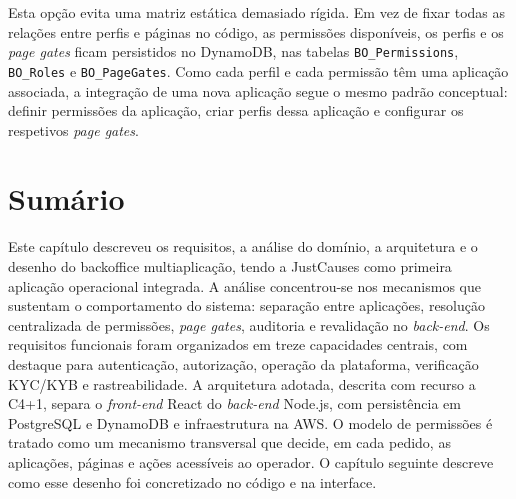 Esta opção evita uma matriz estática demasiado rígida. Em vez de fixar todas as relações entre perfis e páginas no código, as permissões disponíveis, os perfis e os \textit{page gates} ficam persistidos no DynamoDB, nas tabelas \texttt{BO\_Permissions}, \texttt{BO\_Roles} e \texttt{BO\_PageGates}. Como cada perfil e cada permissão têm uma aplicação associada, a integração de uma nova aplicação segue o mesmo padrão conceptual: definir permissões da aplicação, criar perfis dessa aplicação e configurar os respetivos \textit{page gates}.


\section{Sumário}
\label{sec:sumario_cap3}

Este capítulo descreveu os requisitos, a análise do domínio, a arquitetura e o desenho do backoffice multiaplicação, tendo a JustCauses como primeira aplicação operacional integrada. A análise concentrou-se nos mecanismos que sustentam o comportamento do sistema: separação entre aplicações, resolução centralizada de permissões, \textit{page gates}, auditoria e revalidação no \textit{back-end}. Os requisitos funcionais foram organizados em treze capacidades centrais, com destaque para autenticação, autorização, operação da plataforma, verificação \gls{KYC}/\gls{KYB} e rastreabilidade. A arquitetura adotada, descrita com recurso a C4+1, separa o \textit{front-end} React do \textit{back-end} Node.js, com persistência em \gls{PostgreSQL} e DynamoDB e infraestrutura na AWS. O modelo de permissões é tratado como um mecanismo transversal que decide, em cada pedido, as aplicações, páginas e ações acessíveis ao operador. O capítulo seguinte descreve como esse desenho foi concretizado no código e na interface.

